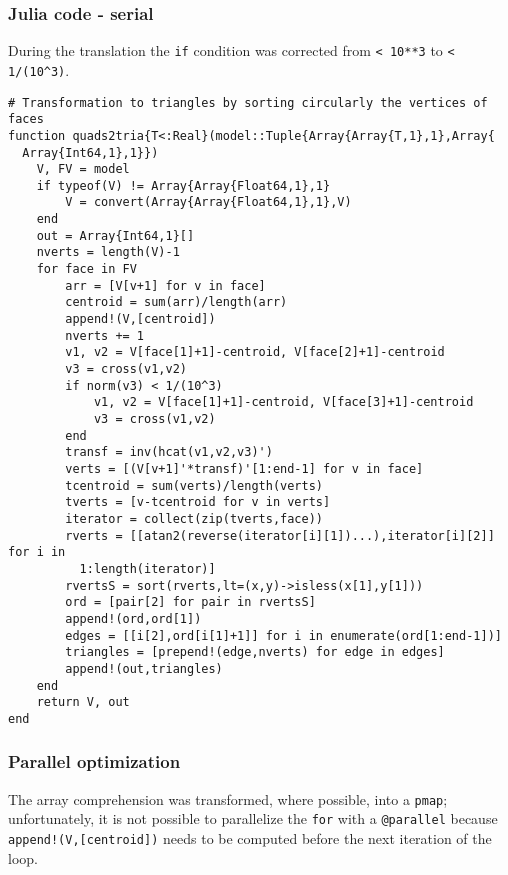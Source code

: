 \documentclass[a4paper,12pt,titlepage]{article}					%
\begin{document}
\subsubsection{Julia code - serial}
During the translation the \texttt{if} condition was corrected from \texttt{< 10**3} to \texttt{< 1/(10\^{}3)}.

\begin{Verbatim}
# Transformation to triangles by sorting circularly the vertices of faces
function quads2tria{T<:Real}(model::Tuple{Array{Array{T,1},1},Array{
  Array{Int64,1},1}})
	V, FV = model
	if typeof(V) != Array{Array{Float64,1},1}
		V = convert(Array{Array{Float64,1},1},V)
	end
	out = Array{Int64,1}[]
	nverts = length(V)-1
	for face in FV
		arr = [V[v+1] for v in face]
		centroid = sum(arr)/length(arr)
		append!(V,[centroid])
		nverts += 1
		v1, v2 = V[face[1]+1]-centroid, V[face[2]+1]-centroid
		v3 = cross(v1,v2)
		if norm(v3) < 1/(10^3)
			v1, v2 = V[face[1]+1]-centroid, V[face[3]+1]-centroid
			v3 = cross(v1,v2)
		end
		transf = inv(hcat(v1,v2,v3)')
		verts = [(V[v+1]'*transf)'[1:end-1] for v in face]
		tcentroid = sum(verts)/length(verts)
		tverts = [v-tcentroid for v in verts]
		iterator = collect(zip(tverts,face))
		rverts = [[atan2(reverse(iterator[i][1])...),iterator[i][2]] for i in
		  1:length(iterator)]
		rvertsS = sort(rverts,lt=(x,y)->isless(x[1],y[1]))
		ord = [pair[2] for pair in rvertsS]
		append!(ord,ord[1])
		edges = [[i[2],ord[i[1]+1]] for i in enumerate(ord[1:end-1])]
		triangles = [prepend!(edge,nverts) for edge in edges]
		append!(out,triangles)
	end
	return V, out
end
\end{Verbatim}

\subsubsection{Parallel optimization}
The array comprehension was transformed, where possible, into a \texttt{pmap}; unfortunately, it is not possible to parallelize the \texttt{for} with a \texttt{@parallel} because \texttt{append!(V,[centroid])} needs to be computed before the next iteration of the loop.
\end{document}
